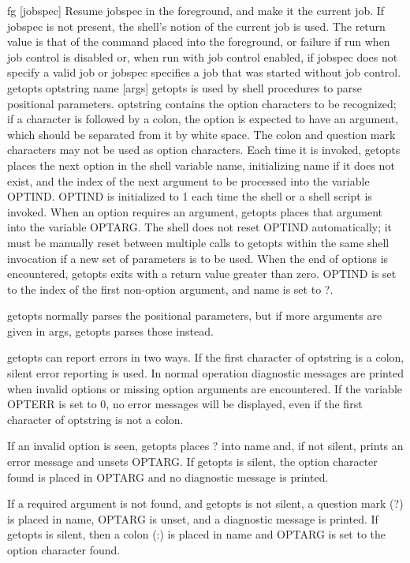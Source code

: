 fg [jobspec]
Resume jobspec in the foreground, and make it the current job. If jobspec is not present, the shell's notion of the current job is used. The return value is that of the command placed into the foreground, or failure if run when job control is disabled or, when run with job control enabled, if jobspec does not specify a valid job or jobspec specifies a job that was started without job control.
getopts optstring name [args]
getopts is used by shell procedures to parse positional parameters. optstring contains the option characters to be recognized; if a character is followed by a colon, the option is expected to have an argument, which should be separated from it by white space. The colon and question mark characters may not be used as option characters. Each time it is invoked, getopts places the next option in the shell variable name, initializing name if it does not exist, and the index of the next argument to be processed into the variable OPTIND. OPTIND is initialized to 1 each time the shell or a shell script is invoked. When an option requires an argument, getopts places that argument into the variable OPTARG. The shell does not reset OPTIND automatically; it must be manually reset between multiple calls to getopts within the same shell invocation if a new set of parameters is to be used.
When the end of options is encountered, getopts exits with a return value greater than zero. OPTIND is set to the index of the first non-option argument, and name is set to ?.

getopts normally parses the positional parameters, but if more arguments are given in args, getopts parses those instead.

getopts can report errors in two ways. If the first character of optstring is a colon, silent error reporting is used. In normal operation diagnostic messages are printed when invalid options or missing option arguments are encountered. If the variable OPTERR is set to 0, no error messages will be displayed, even if the first character of optstring is not a colon.

If an invalid option is seen, getopts places ? into name and, if not silent, prints an error message and unsets OPTARG. If getopts is silent, the option character found is placed in OPTARG and no diagnostic message is printed.

If a required argument is not found, and getopts is not silent, a question mark (?) is placed in name, OPTARG is unset, and a diagnostic message is printed. If getopts is silent, then a colon (:) is placed in name and OPTARG is set to the option character found.

